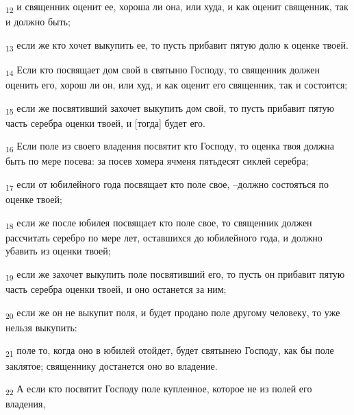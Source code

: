 \begin{tcolorbox}
\textsubscript{12} и священник оценит ее, хороша ли она, или худа, и как оценит священник, так и должно быть;
\end{tcolorbox}
\begin{tcolorbox}
\textsubscript{13} если же кто хочет выкупить ее, то пусть прибавит пятую долю к оценке твоей.
\end{tcolorbox}
\begin{tcolorbox}
\textsubscript{14} Если кто посвящает дом свой в святыню Господу, то священник должен оценить его, хорош ли он, или худ, и как оценит его священник, так и состоится;
\end{tcolorbox}
\begin{tcolorbox}
\textsubscript{15} если же посвятивший захочет выкупить дом свой, то пусть прибавит пятую часть серебра оценки твоей, и [тогда] будет его.
\end{tcolorbox}
\begin{tcolorbox}
\textsubscript{16} Если поле из своего владения посвятит кто Господу, то оценка твоя должна быть по мере посева: за посев хомера ячменя пятьдесят сиклей серебра;
\end{tcolorbox}
\begin{tcolorbox}
\textsubscript{17} если от юбилейного года посвящает кто поле свое, --должно состояться по оценке твоей;
\end{tcolorbox}
\begin{tcolorbox}
\textsubscript{18} если же после юбилея посвящает кто поле свое, то священник должен рассчитать серебро по мере лет, оставшихся до юбилейного года, и должно убавить из оценки твоей;
\end{tcolorbox}
\begin{tcolorbox}
\textsubscript{19} если же захочет выкупить поле посвятивший его, то пусть он прибавит пятую часть серебра оценки твоей, и оно останется за ним;
\end{tcolorbox}
\begin{tcolorbox}
\textsubscript{20} если же он не выкупит поля, и будет продано поле другому человеку, то уже нельзя выкупить:
\end{tcolorbox}
\begin{tcolorbox}
\textsubscript{21} поле то, когда оно в юбилей отойдет, будет святынею Господу, как бы поле заклятое; священнику достанется оно во владение.
\end{tcolorbox}
\begin{tcolorbox}
\textsubscript{22} А если кто посвятит Господу поле купленное, которое не из полей его владения,
\end{tcolorbox}
